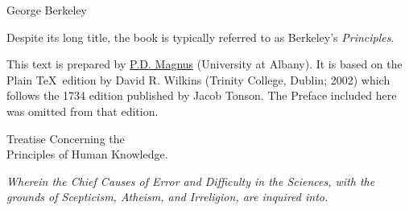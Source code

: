 \documentclass[]{article}
\newcommand*{\authortitle}[1]{\medskip\centerline{\Huge\sc #1}\bigskip}
\newcommand*{\itemtitle}[1]{\pagebreak[2]\begin{center}{\LARGE\sc #1}\end{center}}
\newcommand*{\itemsubtitle}[1]{\begin{center}\emph{#1}\end{center}}
\begin{document}

\authortitle{George Berkeley}



\noindent
Despite its long title, the book is typically referred to as Berkeley's \emph{Principles}.

This text is prepared by \href{https://www.fecundity.com}{P.D. Magnus} (University at Albany). It is based on the Plain \TeX\ edition by David R. Wilkins (Trinity College, Dublin; 2002) which follows the 1734 edition published by Jacob Tonson. The Preface included here was omitted from that edition.

\itemtitle{Treatise Concerning the\\ Principles of Human Knowledge.}
\itemsubtitle{Wherein the Chief Causes of Error and Difficulty in the Sciences, with the grounds of Scepticism, Atheism, and Irreligion, are inquired into.}



\setcounter{tocdepth}{1}
\tableofcontents

\pagestyle{fancy}
\lfoot{\thepage}
\cfoot{}


\bigskip
\end{document}

